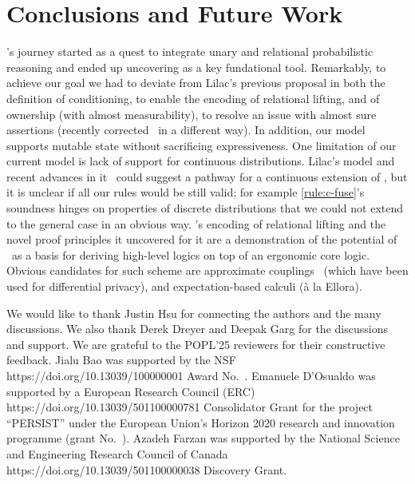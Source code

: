 \section{Conclusions and Future Work}
\thelogic's journey started as a quest to integrate unary and relational
probabilistic reasoning and ended up uncovering \supercond{}
as a key fundational tool.
Remarkably, to achieve our goal we had to deviate from Lilac's previous
proposal in both the definition of conditioning,
  to enable the encoding of relational lifting,
and of ownership (with almost measurability),
  to resolve an issue with almost sure assertions
(recently corrected~\cite{lilac2} in a different way).
In addition, our model supports mutable state without sacrificing
expressiveness.
One limitation of our current model is lack of support for continuous
distributions.
Lilac's model and recent advances in it~\cite{LiAJ0H24} could suggest a pathway for a continuous extension of \thelogic,
but it is unclear if all our rules would be still valid;
for example \cref{rule:c-fuse}'s soundness hinges on properties of discrete distributions that we could not extend to the general case in an obvious way.
\thelogic's encoding of relational lifting and the novel proof principles it uncovered for it are a demonstration of the potential
of \supercond\ as a basis for deriving high-level logics on top of an ergonomic
core logic.
Obvious candidates for such scheme are approximate couplings~\cite{apRHL}
(which have been used for \eg differential privacy),
and expectation-based calculi (à la Ellora).
 
\begin{acks}
  We would like to thank Justin Hsu
  for connecting the authors and the many discussions.
  We also thank Derek Dreyer and Deepak Garg for the
  discussions and support.
  We are grateful to the POPL'25 reviewers for
  their constructive feedback.
  Jialu Bao was supported by the
    {NSF}
    {https://doi.org/10.13039/100000001}
  Award No.~.
  Emanuele D'Osualdo was supported by a
    {European Research Council (ERC)}
    {https://doi.org/10.13039/501100000781}
  Consolidator Grant for the project ``PERSIST'' under the European Union's Horizon 2020 research and innovation programme
  (grant No.~).
Azadeh Farzan was supported by the
    {National Science and Engineering Research Council of Canada}
    {https://doi.org/10.13039/501100000038}
  Discovery Grant.
\end{acks}


